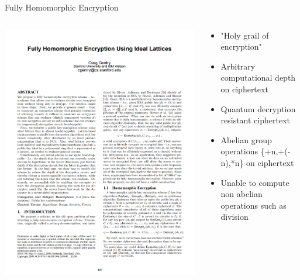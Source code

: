 \documentclass[aspectratio=169]{beamer}
\begin{document}
    \begin{frame}{Fully Homomorphic Encryption}
      \begin{columns}
        \begin{column}{0.5\textwidth}
          \includegraphics[width=0.8\linewidth]{gentry.png}
        \end{column}
        \begin{column}{0.5\textwidth}
          \begin{itemize}
            \item "Holy grail of encryption"
            \item Arbitrary computational depth on ciphertext
            \item Quantum decryption resistant ciphertext
            \item Abelian group operations \{+n,+(-n),*n\} on ciphertext
            \item Unable to compute non abelian operations such as division
          \end{itemize}
        \end{column}
      \end{columns}
    \end{frame}
\end{document}
